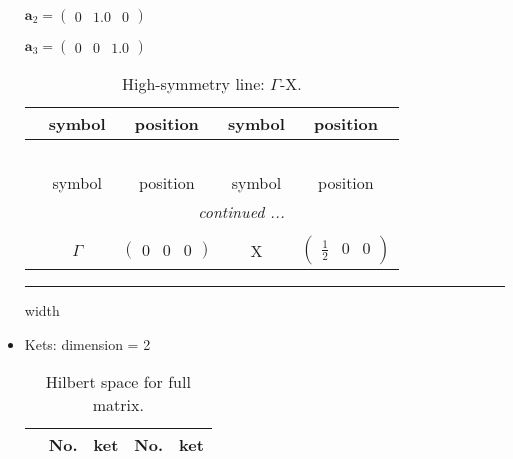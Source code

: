 \documentclass[fleqn,10pt,landscape]{article}
\begin{document}
\begin{itemize}
\quad $\bm{a}_2=\begin{pmatrix} 0 & 1.0 & 0 \end{pmatrix}$

\quad $\bm{a}_3=\begin{pmatrix} 0 & 0 & 1.0 \end{pmatrix}$

\begin{center}
\renewcommand{\arraystretch}{1.3}
\begin{longtable}{c|cc|cc}
\caption{High-symmetry line: $\Gamma$-X.}
 \\
 \hline \hline
 & symbol & position & symbol & position \\ \hline \endfirsthead

\multicolumn{4}{l}{\tablename\ \thetable{}} \\
 \hline \hline
 & symbol & position & symbol & position \\ \hline \endhead

 \hline \hline
\multicolumn{4}{r}{\footnotesize\it continued ...} \\ \endfoot

 \hline \hline
\multicolumn{4}{r}{} \\ \endlastfoot

 & $\Gamma$ & $\begin{pmatrix} 0 & 0 & 0 \end{pmatrix}$ & X & $\begin{pmatrix} \frac{1}{2} & 0 & 0 \end{pmatrix}$ \\
\end{longtable}
\end{center}

 \hfil \hrule height 1mm width \textwidth \hfil

\item Kets: dimension = 2
\begin{center}
\renewcommand{\arraystretch}{1.3}
\begin{longtable}{c|cc|cc}
\caption{Hilbert space for full matrix.}
 \\
 \hline \hline
 & No. & ket & No. & ket \\ \hline \endfirsthead


\end{longtable}
\end{center}
\end{itemize}
\end{document}
